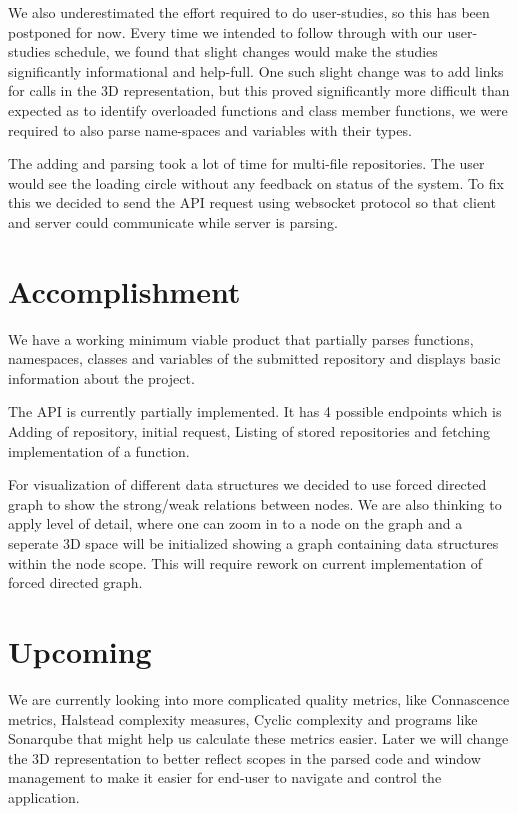We also underestimated the effort required to do user-studies, so this has been postponed for now. Every time we intended to follow through with our user-studies schedule, we found that slight changes would make the studies significantly informational and help-full. One such slight change was to add links for calls in the 3D representation, but this proved significantly more difficult than expected as to identify overloaded functions and class member functions, we were required to also parse name-spaces and variables with their types.

The adding and parsing took a lot of time for multi-file repositories. The user would see the loading circle without any feedback on status of the system. To fix this we decided to send the API request using websocket protocol so that client and server could communicate while server is parsing.

\section*{Accomplishment}
We have a working minimum viable product that partially parses functions, namespaces, classes and variables of the submitted repository and displays basic information about the project. 

The API is currently partially implemented. It has 4 possible endpoints which is Adding of repository, initial request, Listing of stored repositories and fetching implementation of a function.

For visualization of different data structures we decided to use forced directed graph to show the strong/weak relations between nodes. We are also thinking to apply level of detail, where one can zoom in to a node on the graph and a seperate 3D space will be initialized showing a graph containing data structures within the node scope. This will require rework on current implementation of forced directed graph.

\section*{Upcoming}
We are currently looking into more complicated quality metrics, like Connascence metrics, Halstead complexity measures, Cyclic complexity and programs like Sonarqube that might help us calculate these metrics easier.
Later we will change the 3D representation to better reflect scopes in the parsed code and window management to make it easier for end-user to navigate and control the application. 
\newpage

